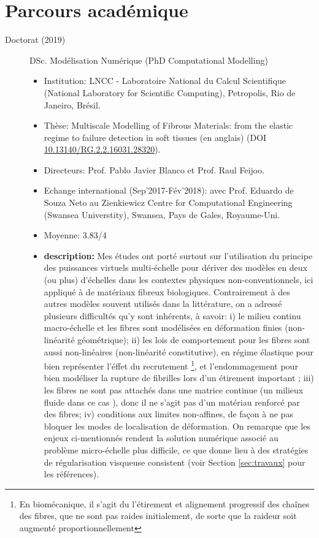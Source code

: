 \documentclass[french]{article}
\begin{document}
\section*{Parcours académique}
\begin{description}
\item[Doctorat (2019)] DSc. Modélisation Numérique (PhD Computational Modelling)
\begin{itemize}
\item Institution: LNCC - Laboratoire National du Calcul Scientifique (National Laboratory for Scientific Computing),  Petropolis, Rio de Janeiro, Brésil.
\item Thèse: Multiscale Modelling of Fibrous Materials: from the elastic regime to failure detection in soft tissues (en anglais) (DOI \url{10.13140/RG.2.2.16031.28320}).
\item Directeurs: Prof. Pablo Javier Blanco et Prof. Raul Feijoo.
\item Echange international (Sep'2017-Fév'2018): avec Prof. Eduardo de Souza Neto au Zienkiewicz Centre for Computational Engineering (Swansea Universtity), Swansea, Pays de Gales, Royaume-Uni.
\item Moyenne: 3.83/4 
\item \textbf{description:} 
Mes études ont porté surtout sur l'utilisation du principe des puissances virtuels multi-échelle pour dériver des modèles en deux (ou plus) d'échelles dans les contextes physiques non-conventionnels, ici appliqué à de matériaux fibreux biologiques. Contrairement à des autres modèles souvent utilisés dans la littérature, on a adressé plusieurs difficultés qu'y sont inhérents, à savoir: i) le milieu continu macro-échelle et les fibres sont modélisées en déformation finies (non-linéarité géométrique); ii) les lois de comportement pour les fibres sont aussi non-linéaires (non-linéarité constitutive), en régime élastique pour bien représenter l'éffet du recrutement \footnote{En biomécanique, il s'agit du l'étirement et alignement progressif des chaînes des fibres, que ne sont pas raides initialement, de sorte que la raideur soit augmenté proportionnellement}, et l'endommagement pour bien modéliser la rupture de fibrilles lors d'un étirement important ; iii) les fibres ne sont pas attachés dans une matrice continue (un milieux fluide dans ce cas ), donc il ne s'agit pas d'un matériau renforcé par des fibres; iv) conditions aux limites non-affines, de façon à ne pas bloquer les modes de localisation de déformation. On remarque que les enjeux ci-mentionnés rendent la solution numérique associé au problème micro-échelle plus difficile, ce que donne lieu à des stratégies de régularisation visqueuse consistent (voir Section \ref{sec:travaux} pour les références).

\end{itemize}
\end{description}
\end{document}
